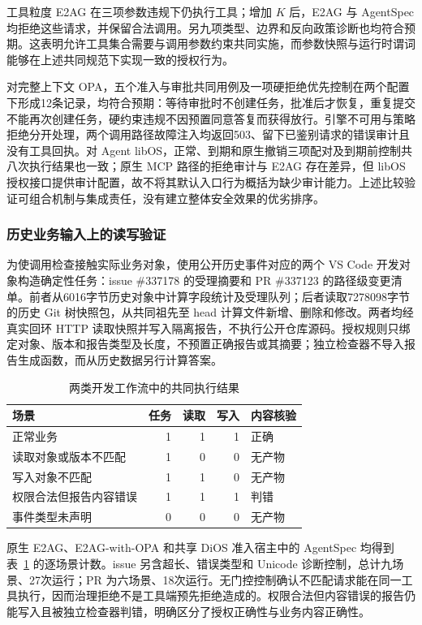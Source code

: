 工具粒度 E2AG 在三项参数违规下仍执行工具；增加 $K$ 后，E2AG 与 AgentSpec 均拒绝这些请求，并保留合法调用。另九项类型、边界和反向政策诊断也均符合预期。这表明允许工具集合需要与调用参数约束共同实施，而参数快照与运行时谓词能够在上述共同规范下实现一致的授权行为。

对完整上下文 OPA，五个准入与审批共同用例及一项硬拒绝优先控制在两个配置下形成12条记录，均符合预期：等待审批时不创建任务，批准后才恢复，重复提交不能再次创建任务，硬约束违规不因预置同意答复而获得放行。引擎不可用与策略拒绝分开处理，两个调用路径故障注入均返回503、留下已鉴别请求的错误审计且没有工具回执。对 Agent libOS，正常、到期和原生撤销三项配对及到期前控制共八次执行结果也一致；原生 MCP 路径的拒绝审计与 E2AG 存在差异，但 libOS 授权接口提供审计配置，故不将其默认入口行为概括为缺少审计能力。上述比较验证可组合机制与集成责任，没有建立整体安全效果的优劣排序。

\subsubsection{历史业务输入上的读写验证}
\label{sec:business-rr022}

为使调用检查接触实际业务对象，使用公开历史事件对应的两个 VS Code 开发对象构造确定性任务：issue \#337178 的受理摘要和 PR \#337123 的路径级变更清单。前者从6016字节历史对象中计算字段统计及受理队列；后者读取7278098字节的历史 Git 树快照包，从共同祖先至 head 计算文件新增、删除和修改。两者均经真实回环 HTTP 读取快照并写入隔离报告，不执行公开仓库源码。授权规则只绑定对象、版本和报告类型及长度，不预置正确报告或其摘要；独立检查器不导入报告生成函数，而从历史数据另行计算答案。

\begin{table}[htbp]
\centering
\caption{两类开发工作流中的共同执行结果}
\label{tab:business-rr022}
\small
\begin{tabular}{p{50mm}rrrp{31mm}}
\toprule
场景 & 任务 & 读取 & 写入 & 内容核验 \\
\midrule
正常业务 & 1 & 1 & 1 & 正确 \\
读取对象或版本不匹配 & 1 & 0 & 0 & 无产物 \\
写入对象不匹配 & 1 & 1 & 0 & 无产物 \\
权限合法但报告内容错误 & 1 & 1 & 1 & 判错 \\
事件类型未声明 & 0 & 0 & 0 & 无产物 \\
\bottomrule
\end{tabular}
\end{table}

原生 E2AG、E2AG-with-OPA 和共享 DiOS 准入宿主中的 AgentSpec 均得到表~\ref{tab:business-rr022} 的逐场景计数。issue 另含超长、错误类型和 Unicode 诊断控制，总计九场景、27次运行；PR 为六场景、18次运行。无门控控制确认不匹配请求能在同一工具执行，因而治理拒绝不是工具端预先拒绝造成的。权限合法但内容错误的报告仍能写入且被独立检查器判错，明确区分了授权正确性与业务内容正确性。

